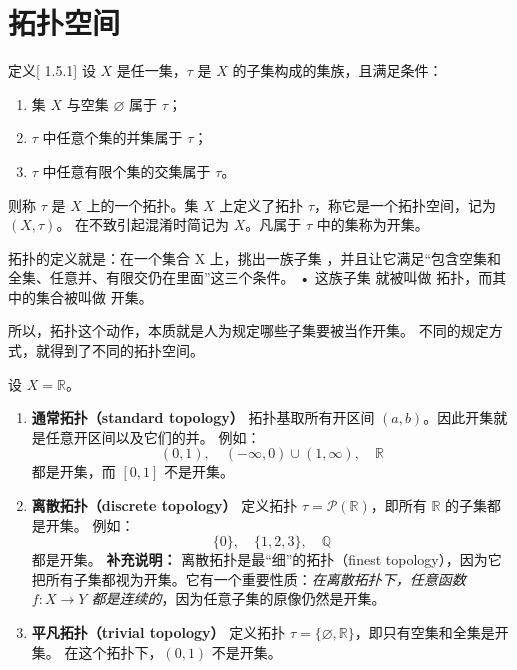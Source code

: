 \section{拓扑空间}
\begin{definition}[拓扑所有开集的集合]定义[ 1.5.1]
设 $X$ 是任一集，$\tau$ 是 $X$ 的子集构成的集族，且满足条件：
\begin{enumerate}
  \item 集 $X$ 与空集 $\varnothing$ 属于 $\tau$；
  \item $\tau$ 中任意个集的并集属于 $\tau$；
  \item $\tau$ 中任意有限个集的交集属于 $\tau$。
\end{enumerate}
则称 $\tau$ 是 $X$ 上的一个拓扑。集 $X$ 上定义了拓扑 $\tau$，称它是一个拓扑空间，记为 $(X,\tau)$。
在不致引起混淆时简记为 $X$。凡属于 $\tau$ 中的集称为开集。
\end{definition}
\begin{dxtips}
拓扑的定义就是：在一个集合 X 上，挑出一族子集 \tau，并且让它满足“包含空集和全集、任意并、有限交仍在里面”这三个条件。
•	这族子集 \tau 就被叫做 拓扑，而其中的集合被叫做 开集。

所以，拓扑这个动作，本质就是人为规定哪些子集要被当作开集。
不同的规定方式，就得到了不同的拓扑空间。
\end{dxtips}
\begin{example}[不同的拓扑]
设 $X=\mathbb{R}$。

\begin{enumerate}
  \item \textbf{通常拓扑（standard topology）}  
  拓扑基取所有开区间 $(a,b)$。因此开集就是任意开区间以及它们的并。  
  例如：
  \[
  (0,1), \quad (-\infty,0)\cup(1,\infty), \quad \mathbb{R}
  \]
  都是开集，而 $[0,1]$ 不是开集。

  \item \textbf{离散拓扑（discrete topology）}  
  定义拓扑 $\tau=\mathcal{P}(\mathbb{R})$，即所有 $\mathbb{R}$ 的子集都是开集。  
  例如：
  \[
  \{0\}, \quad \{1,2,3\}, \quad \mathbb{Q}
  \]
  都是开集。  
  \textbf{补充说明：} 离散拓扑是最“细”的拓扑（finest topology），因为它把所有子集都视为开集。它有一个重要性质：\emph{在离散拓扑下，任意函数 $f:X\to Y$ 都是连续的}，因为任意子集的原像仍然是开集。

  \item \textbf{平凡拓扑（trivial topology）}  
  定义拓扑 $\tau=\{\varnothing,\mathbb{R}\}$，即只有空集和全集是开集。  
  在这个拓扑下，$(0,1)$ 不是开集。

\end{enumerate}
\end{example}
